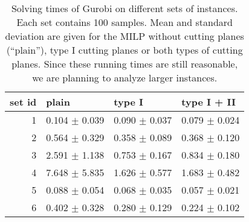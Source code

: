 

\begin{knitrout}
\color{fgcolor}\begin{table}[H]
\centering
\caption{\label{tab:unnamed-chunk-2}Solving times of Gurobi on different sets of instances. Each set contains 100 samples. Mean and standard deviation are given for the MILP without cutting planes (``plain''), type I cutting planes or both types of cutting planes. {\color{blue} Since these running times are still reasonable, we are planning to analyze larger instances.} \label{tab:running_times}}
\centering
\begin{tabular}[t]{rlll}
\toprule
set id & plain & type I & type I + II\\
\midrule
1 & 0.104 $\pm$ 0.039 & 0.090 $\pm$ 0.037 & 0.079 $\pm$ 0.024\\
2 & 0.564 $\pm$ 0.329 & 0.358 $\pm$ 0.089 & 0.368 $\pm$ 0.120\\
3 & 2.591 $\pm$ 1.138 & 0.753 $\pm$ 0.167 & 0.834 $\pm$ 0.180\\
4 & 7.648 $\pm$ 5.835 & 1.626 $\pm$ 0.577 & 1.683 $\pm$ 0.482\\
5 & 0.088 $\pm$ 0.054 & 0.068 $\pm$ 0.035 & 0.057 $\pm$ 0.021\\
6 & 0.402 $\pm$ 0.328 & 0.280 $\pm$ 0.129 & 0.224 $\pm$ 0.102\\
\bottomrule
\end{tabular}
\end{table}

\end{knitrout}

